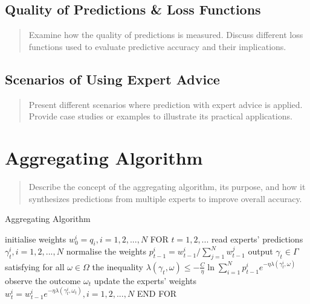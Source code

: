 \documentclass[11pt]{article} %
\theoremstyle{plain}
\theoremstyle{definition}
\begin{document}
\subsection{Quality of Predictions \& Loss Functions}
\begin{quote}
  Examine how the quality of predictions is measured. Discuss different loss functions used to evaluate predictive accuracy and their implications.
\end{quote}

\subsection{Scenarios of Using Expert Advice}
\begin{quote}
  Present different scenarios where prediction with expert advice is applied. Provide case studies or examples to illustrate its practical applications.
\end{quote}

\newpage

\section{Aggregating Algorithm}
\begin{quote}
  Describe the concept of the aggregating algorithm, its purpose, and how it synthesizes predictions from multiple experts to improve overall accuracy.
\end{quote}

\begin{algorithm}
  \caption{Aggregating Algorithm}\label{alg:cap}
  \begin{algorithmic}[1]
    \State initialise weights $w^i_0 = q_i, i = 1, 2, ..., N$
    \State FOR $t = 1, 2, ...$
    \State \hspace{\algorithmicindent} read experts' predictions $\gamma^i_t, i=1, 2, ..., N$
    \State \hspace{\algorithmicindent} normalise the weights $p^i_{t-1} = w^i_{t-1} / \sum^N_{j=1} w^j_{t-1}$
    \State \hspace{\algorithmicindent} output $\gamma_t \in \Gamma$ satisfying for all $\omega \in \Omega$ the inequality\newline\hspace*{\algorithmicindent}\hspace{\algorithmicindent} $\lambda(\gamma_t, \omega) \leq - \frac{C}{\eta} \ln \sum^N_{i=1}p^i_{t-1}e^{-\eta\lambda(\gamma^i_t, \omega)}$
    \State \hspace{\algorithmicindent} observe the outcome $\omega_t$
    \State \hspace{\algorithmicindent} update the experts' weights $w^i_t = w^i_{t-1} e^{-\eta \lambda(\gamma^i_t, \omega_t)}, i = 1, 2, ..., N$
    \State END FOR
  \end{algorithmic}
\end{algorithm}
\end{document}
